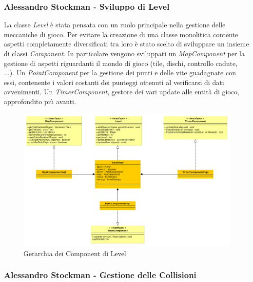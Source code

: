 \documentclass[a4paper,12pt, hidelinks]{report}
\begin{document}
\begin{flushright}
\item\subsubsection{Alessandro Stockman - Sviluppo di Level}
\end{flushright}

La classe \emph{Level} è stata pensata con un ruolo principale nella gestione delle meccaniche di gioco. Per evitare la creazione di una classe monolitica contente aspetti completamente diversificati tra loro è stato scelto di sviluppare un insieme di classi \emph{Component}.
In particolare vengono sviluppati un \emph{MapComponent} per la gestione di aspetti riguardanti il mondo di gioco (tile, dischi, controllo cadute, ...).
Un \emph{PointComponent} per la gestione dei punti e delle vite guadagnate con essi, contenente i valori costanti dei punteggi ottenuti al verificarsi di dati avvenimenti.
Un \emph{TimerComponent}, gestore dei vari update alle entità di gioco, approfondito più avanti.

\begin{figure}[H]
\centering{}
\includegraphics[width=\linewidth]{img/LevelArchitecture}
\caption{Gerarchia dei Component di Level}
\label{img:LevelArchitecture}
\end{figure}

\begin{flushright}
\item\subsubsection{Alessandro Stockman - Gestione delle Collisioni}
\end{flushright}
\end{document}
